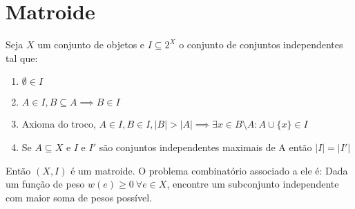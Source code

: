 \section{Matroide}
Seja $X$ um conjunto de objetos e $I \subseteq 2^X$ o conjunto de conjuntos independentes tal que:
\begin{enumerate}
\item $\emptyset \in I$
\item $A \in I, B \subseteq A \implies B \in I$
\item Axioma do troco, $A \in I, B \in I, |B| > |A| \implies \exists x \in B \setminus A : A \cup \{x\} \in I$
\item Se $A \subseteq X$ e $I$ e $I'$ são conjuntos independentes maximais de A então $|I| = |I'|$
\end{enumerate}
Então $(X, I)$ é um matroide. O problema combinatório associado a ele é: Dada um função de peso $w(e) \geq 0 ~\forall e \in X$, encontre um subconjunto independente com maior soma de pesos possível.
